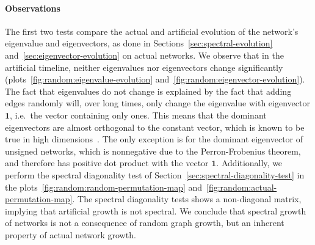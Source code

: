 \documentclass[11pt,a4paper]{book}
\begin{document}
\paragraph{Observations}
The first two tests compare the actual and artificial evolution of the
network's eigenvalue and eigenvectors, as done in
Sections~\ref{sec:spectral-evolution}
and~\ref{sec:eigenvector-evolution} on actual networks.  We observe that
in the artificial timeline, neither eigenvalues nor eigenvectors change
significantly (plots~\ref{fig:random:eigenvalue-evolution}
and~\ref{fig:random:eigenvector-evolution}).  The fact that eigenvalues
do not change is explained by the fact that adding edges randomly will,
over long times, only change the eigenvalue with eigenvector $\mathbf
1$, i.e.\ the vector containing only ones.  This means that the dominant
eigenvectors are almost orthogonal to the constant vector, which is
known to be true in high dimensions~\cite{b662}.  The only exception is
for the dominant eigenvector of unsigned networks, which is nonnegative
due to the Perron-Frobenius theorem, and therefore has positive dot
product with the vector $\mathbf 1$.  Additionally, we perform the
spectral diagonality test of Section~\ref{sec:spectral-diagonality-test}
in the plots~\ref{fig:random:random-permutation-map}
and~\ref{fig:random:actual-permutation-map}. The spectral diagonality
tests shows a non-diagonal matrix, implying that artificial growth is
not spectral.  We conclude that spectral growth of networks is not a
consequence of random graph growth, but an inherent property of actual
network growth.
\end{document}
